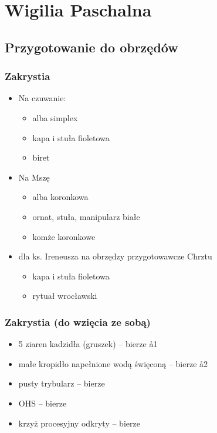 \chapter{Wigilia Paschalna}

\section{Przygotowanie do obrzędów}

\subsection{Zakrystia}
\begin{itemize}
	\item Na czuwanie:
	      \begin{itemize}
		      \item alba simplex
		      \item kapa i stuła {\color{violet} fioletowa}
		      \item biret
	      \end{itemize}
	\item Na Mszę
	      \begin{itemize}
		      \item alba koronkowa
		      \item ornat, stuła, manipularz białe
		      \item komże koronkowe
	      \end{itemize}
	\item dla ks. Ireneusza na obrzędzy przygotowawcze Chrztu
	      \begin{itemize}
		      \item kapa i stuła {\color{violet} fioletowa}
		      \item rytuał wrocławski
	      \end{itemize}
\end{itemize}

\subsection{Zakrystia (do wzięcia ze sobą)}
\begin{itemize}
	\item  5 ziaren kadzidła (gruszek) --  bierze \aa1
	\item małe kropidło napełnione wodą święconą -- bierze \aa2
	\item pusty trybularz -- bierze \tt
	\item OHS --  bierze 
	\item krzyż procesyjny odkryty -- bierze 
\end{itemize}

